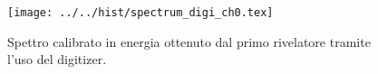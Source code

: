 \begin{figure}[h] \centering\texttt{[image: ../../hist/spectrum\_digi\_ch0.tex]}\caption{Spettro calibrato in energia ottenuto dal primo rivelatore tramite l'uso del digitizer.}\label{hist:spectrum_digi_ch0} \end{figure}
